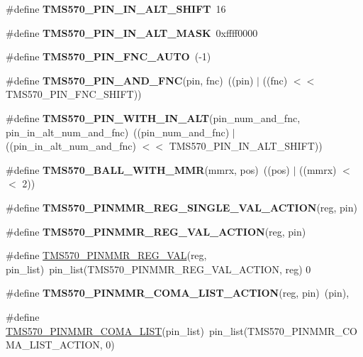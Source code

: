 \begin{DoxyCompactItemize}
\#define {\bfseries T\+M\+S570\+\_\+\+P\+I\+N\+\_\+\+I\+N\+\_\+\+A\+L\+T\+\_\+\+S\+H\+I\+FT}~16
\item 
\mbox{\label{tms570-pinmux_8h_aee5b966e4ce247f8bb893bcf8739ceb3}} 
\#define {\bfseries T\+M\+S570\+\_\+\+P\+I\+N\+\_\+\+I\+N\+\_\+\+A\+L\+T\+\_\+\+M\+A\+SK}~0xffff0000
\item 
\mbox{\label{tms570-pinmux_8h_a224f7d104f7f493309398b14743ab3c4}} 
\#define {\bfseries T\+M\+S570\+\_\+\+P\+I\+N\+\_\+\+F\+N\+C\+\_\+\+A\+U\+TO}~(-\/1)
\item 
\mbox{\label{tms570-pinmux_8h_a8e1f74eac86111080c75dcfe3bc729b6}} 
\#define {\bfseries T\+M\+S570\+\_\+\+P\+I\+N\+\_\+\+A\+N\+D\+\_\+\+F\+NC}(pin,  fnc)~((pin) $\vert$ ((fnc) $<$$<$ T\+M\+S570\+\_\+\+P\+I\+N\+\_\+\+F\+N\+C\+\_\+\+S\+H\+I\+FT))
\item 
\mbox{\label{tms570-pinmux_8h_ade190f7f5cb1ad01b29f1cde6ec3f186}} 
\#define {\bfseries T\+M\+S570\+\_\+\+P\+I\+N\+\_\+\+W\+I\+T\+H\+\_\+\+I\+N\+\_\+\+A\+LT}(pin\+\_\+num\+\_\+and\+\_\+fnc,  pin\+\_\+in\+\_\+alt\+\_\+num\+\_\+and\+\_\+fnc)~((pin\+\_\+num\+\_\+and\+\_\+fnc) $\vert$ ((pin\+\_\+in\+\_\+alt\+\_\+num\+\_\+and\+\_\+fnc) $<$$<$ T\+M\+S570\+\_\+\+P\+I\+N\+\_\+\+I\+N\+\_\+\+A\+L\+T\+\_\+\+S\+H\+I\+FT))
\item 
\mbox{\label{tms570-pinmux_8h_acd89be9e6050af768e9d2052ea4febe9}} 
\#define {\bfseries T\+M\+S570\+\_\+\+B\+A\+L\+L\+\_\+\+W\+I\+T\+H\+\_\+\+M\+MR}(mmrx,  pos)~((pos) $\vert$ ((mmrx) $<$$<$ 2))
\item 
\#define {\bfseries T\+M\+S570\+\_\+\+P\+I\+N\+M\+M\+R\+\_\+\+R\+E\+G\+\_\+\+S\+I\+N\+G\+L\+E\+\_\+\+V\+A\+L\+\_\+\+A\+C\+T\+I\+ON}(reg,  pin)
\item 
\#define {\bfseries T\+M\+S570\+\_\+\+P\+I\+N\+M\+M\+R\+\_\+\+R\+E\+G\+\_\+\+V\+A\+L\+\_\+\+A\+C\+T\+I\+ON}(reg,  pin)
\item 
\#define \mbox{\hyperlink{tms570-pinmux_8h_a8c716a1464fdfd7aa36e422ab8ee2278}{T\+M\+S570\+\_\+\+P\+I\+N\+M\+M\+R\+\_\+\+R\+E\+G\+\_\+\+V\+AL}}(reg,  pin\+\_\+list)~pin\+\_\+list(T\+M\+S570\+\_\+\+P\+I\+N\+M\+M\+R\+\_\+\+R\+E\+G\+\_\+\+V\+A\+L\+\_\+\+A\+C\+T\+I\+ON, reg) 0
\item 
\mbox{\label{tms570-pinmux_8h_a19bf3eac824052349a8347bbd5daa5e7}} 
\#define {\bfseries T\+M\+S570\+\_\+\+P\+I\+N\+M\+M\+R\+\_\+\+C\+O\+M\+A\+\_\+\+L\+I\+S\+T\+\_\+\+A\+C\+T\+I\+ON}(reg,  pin)~(pin),
\item 
\#define \mbox{\hyperlink{tms570-pinmux_8h_ae8298307eab7ef81053dd6307c3eb00e}{T\+M\+S570\+\_\+\+P\+I\+N\+M\+M\+R\+\_\+\+C\+O\+M\+A\+\_\+\+L\+I\+ST}}(pin\+\_\+list)~pin\+\_\+list(T\+M\+S570\+\_\+\+P\+I\+N\+M\+M\+R\+\_\+\+C\+O\+M\+A\+\_\+\+L\+I\+S\+T\+\_\+\+A\+C\+T\+I\+ON, 0)
\end{DoxyCompactItemize}
